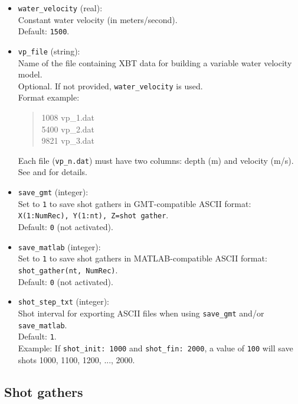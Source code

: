 \documentclass[11pt, oneside]{article}   	%
\begin{document}
\begin{itemize}
\item \texttt{water\_velocity} (real):\\
Constant water velocity (in meters/second).\\
Default: \texttt{1500}.

\item \texttt{vp\_file} (string):\\
Name of the file containing XBT data for building a variable water velocity model.\\
Optional. If not provided, \texttt{water\_velocity} is used.\\
Format example:
\begin{quote}
1008 \quad vp\_1.dat\\
5400 \quad vp\_2.dat\\
9821 \quad vp\_3.dat
\end{quote}
Each file (\texttt{vp\_n.dat}) must have two columns: depth (m) and velocity (m/s).\\
See \cite{estela} and \cite{Mackenzie} for details.

\item \texttt{save\_gmt} (integer):\\
Set to \texttt{1} to save shot gathers in GMT-compatible ASCII format:\\
\texttt{X(1:NumRec), Y(1:nt), Z=shot gather}.\\
Default: \texttt{0} (not activated).

\item \texttt{save\_matlab} (integer):\\
Set to \texttt{1} to save shot gathers in MATLAB-compatible ASCII format:\\
\texttt{shot\_gather(nt, NumRec)}.\\
Default: \texttt{0} (not activated).

\item \texttt{shot\_step\_txt} (integer):\\
Shot interval for exporting ASCII files when using \texttt{save\_gmt} and/or \texttt{save\_matlab}.\\
Default: \texttt{1}.\\
Example: If \texttt{shot\_init: 1000} and \texttt{shot\_fin: 2000}, a value of \texttt{100} will save shots 1000, 1100, 1200, ..., 2000.

\end{itemize}

\subsection{Shot gathers}\label{sec4c}
\end{document}
